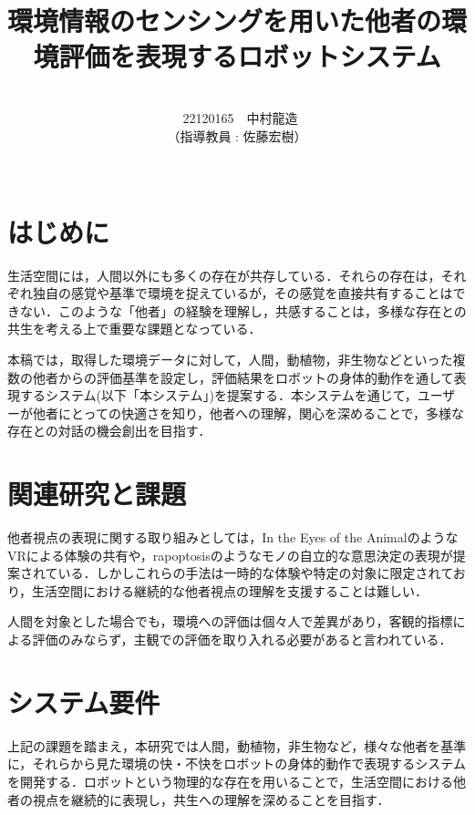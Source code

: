 \documentclass[paper=a4paper,jafontsize=9pt,head_space=15mm,gutter=20mm,
twocolumn,number_of_lines=49, line_length=26zw]{myuarticle}
\begin{document}
\title{{\Large\bfseries\gtfamily 環境情報のセンシングを用いた他者の環境評価を表現するロボットシステム}}
\author{\\\ 22120165　中村龍造 \\ （指導教員 : 佐藤宏樹）\\ \\}
\date{}
\maketitle

\section{はじめに}
生活空間には，人間以外にも多くの存在が共存している．それらの存在は，それぞれ独自の感覚や基準で環境を捉えているが，その感覚を直接共有することはできない．このような「他者」の経験を理解し，共感することは，多様な存在との共生を考える上で重要な課題となっている．

本稿では，取得した環境データに対して，人間，動植物，非生物などといった複数の他者からの評価基準を設定し，評価結果をロボットの身体的動作を通して表現するシステム(以下「本システム」)を提案する．本システムを通じて，ユーザーが他者にとっての快適さを知り，他者への理解，関心を深めることで，多様な存在との対話の機会創出を目指す．

\section{関連研究と課題}

他者視点の表現に関する取り組みとしては，In the Eyes of the Animal\cite{Dezeen-2015-MarshmallowLaserFeastsEyes}のようなVRによる体験の共有や，rapoptosis\cite{--ソンヨン}のようなモノの自立的な意思決定の表現が提案されている．しかしこれらの手法は一時的な体験や特定の対象に限定されており，生活空間における継続的な他者視点の理解を支援することは難しい．

人間を対象とした場合でも，環境への評価は個々人で差異があり，客観的指標による評価のみならず，主観での評価を取り入れる必要があると言われている\cite{Coulby-2020-ScopingReviewTechnologicalApproaches}．

\section{システム要件}

上記の課題を踏まえ，本研究では人間，動植物，非生物など，様々な他者を基準に，それらから見た環境の快・不快をロボットの身体的動作で表現するシステムを開発する．ロボットという物理的な存在を用いることで，生活空間における他者の視点を継続的に表現し，共生への理解を深めることを目指す．
\end{document}
